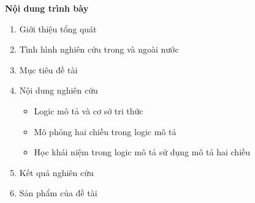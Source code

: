 \documentclass[fleqn]{beamer}
\begin{document}
\begin{frame}{\bf Nội dung trình bày}
\begin{enumerate}
  \item Giới thiệu tổng quát
  \vspace{2.0ex}
  
  \item Tình hình nghiên cứu trong và ngoài nước
  \vspace{2.0ex}
  
  \item Mục tiêu đề tài
  \vspace{2.0ex}

  \item Nội dung nghiên cứu
  \vspace{2.0ex}
  \begin{itemize}
  	\item Logic mô tả và cơ sở tri thức
  	\vspace{1.5ex}
  	\item Mô phỏng hai chiều trong logic mô tả
  	\vspace{1.5ex}
  	\item Học khái niệm trong logic mô tả sử dụng mô tả hai chiều
  \end{itemize}
  \vspace{2.0ex}
  
  \item Kết quả nghiên cứu
  \vspace{2.0ex}
  
  \item Sản phẩm của đề tài    
\end{enumerate}
\end{frame}
\end{document}
